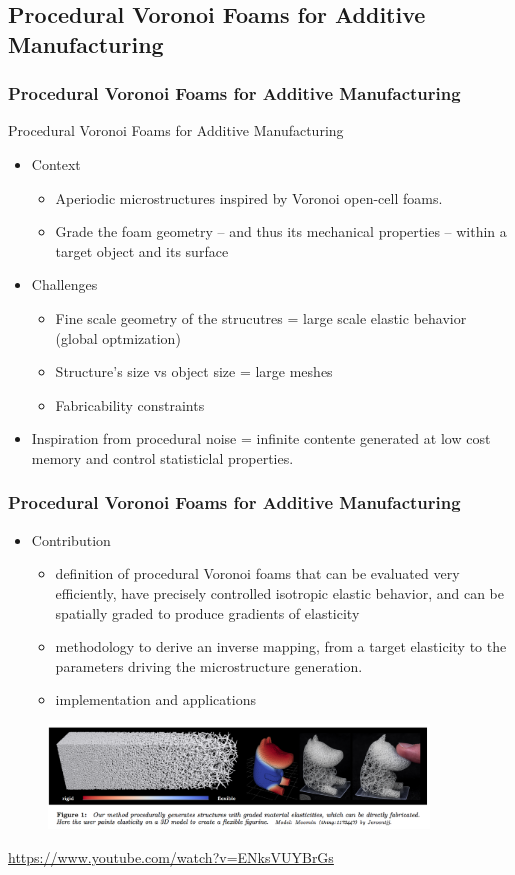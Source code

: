 \subsection{Procedural Voronoi Foams for Additive Manufacturing}
\frame
{
	\frametitle{Procedural Voronoi Foams for Additive Manufacturing}
	
	Procedural Voronoi Foams for Additive Manufacturing \cite{Martinez:2016}
	
	\begin{itemize}[<+->]
		\item Context\\
		
		\begin{itemize}
			\item Aperiodic microstructures inspired by Voronoi open-cell foams.
			\item Grade the foam geometry --  and thus its mechanical properties -- within a target object and its surface
		\end{itemize}
		\item Challenges
		\begin{itemize}[<+->]
			\item Fine scale geometry of the strucutres = large scale elastic behavior (global optmization)
			\item Structure's size vs object size = large meshes
			\item Fabricability constraints
		\end{itemize}
		\item Inspiration from procedural noise = infinite contente generated at low cost memory and control statisticlal properties.
	\end{itemize}
}
\frame
{
	\frametitle{Procedural Voronoi Foams for Additive Manufacturing}
	\begin{itemize}
		\item Contribution
	\begin{itemize}
		\item definition of procedural Voronoi foams that can be evaluated very efficiently, have precisely controlled isotropic elastic behavior, and can be spatially graded to produce gradients of elasticity
		\item methodology to derive an inverse mapping, from a target elasticity to the parameters driving the microstructure generation.
		\item implementation and applications
	\end{itemize}
\end{itemize}
			\begin{figure}
				\centering
				\includegraphics[width=0.9\textwidth]{img/voronoi/headline.png}
			\end{figure}
			\centering
			 \small{\url{https://www.youtube.com/watch?v=ENksVUYBrGs}}
}

